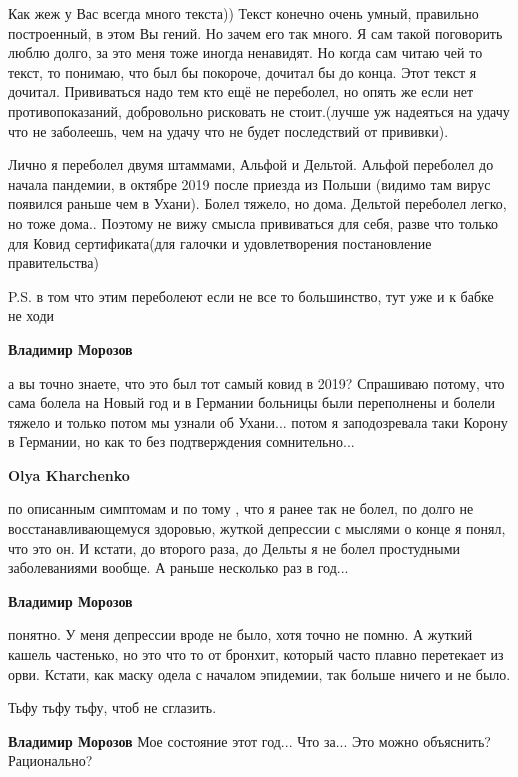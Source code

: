 \begin{itemize}
\begin{itemize}
\end{itemize} %


Как жеж у Вас всегда много текста)) Текст конечно очень умный, правильно
построенный, в этом Вы гений. Но зачем его так много. Я сам такой поговорить
люблю долго, за это меня тоже иногда ненавидят. Но когда сам читаю чей то
текст, то понимаю, что был бы покороче, дочитал бы до конца. Этот текст я
дочитал. Прививаться надо тем кто ещё не переболел, но опять же если нет
противопоказаний, добровольно рисковать не стоит.(лучше уж надеяться на удачу
что не заболеешь, чем на удачу что не будет последствий от прививки).

Лично я переболел двумя штаммами, Альфой и Дельтой. Альфой переболел до начала
пандемии, в октябре 2019 после приезда из Польши (видимо там вирус появился
раньше чем в Ухани). Болел тяжело, но дома. Дельтой переболел легко, но тоже
дома.. Поэтому не вижу смысла прививаться для себя, разве что только для Ковид
сертификата(для галочки и удовлетворения постановление правительства)

P.S. в том что этим переболеют если не все то большинство, тут уже и к бабке не
ходи

\begin{itemize} %
\textbf{Владимир Морозов} 

а вы точно знаете, что это был тот самый ковид в 2019? Спрашиваю потому, что
сама болела на Новый год и в Германии больницы были переполнены и болели тяжело
и только потом мы узнали об Ухани... потом я заподозревала таки Корону в
Германии, но как то без подтверждения сомнительно...

\textbf{Olya Kharchenko} 

по описанным симптомам и по тому , что я ранее так не болел, по долго не
восстанавливающемуся здоровью, жуткой депрессии с мыслями о конце я понял, что
это он. И кстати, до второго раза, до Дельты я не болел простудными
заболеваниями вообще. А раньше несколько раз в год...

\textbf{Владимир Морозов} 

понятно. У меня депрессии вроде не было, хотя точно не помню. А жуткий кашель
частенько, но это что то от бронхит, который часто плавно перетекает из орви.
Кстати, как маску одела с началом эпидемии, так больше ничего и не было.

Тьфу тьфу тьфу, чтоб не сглазить.

\textbf{Владимир Морозов} Мое состояние этот год... Что за... Это можно объяснить? Рационально?


\end{itemize}
\end{itemize}
